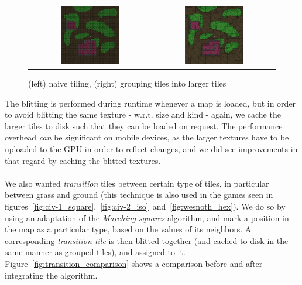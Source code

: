 \begin{figure}[H]
    \centering
    \begin{tabular}{cc}
        \includegraphics[width=0.5\textwidth]{figures/generating_levels/naive-tile.png}
        &
        \includegraphics[width=0.5\textwidth]{figures/generating_levels/grouped-tile.png}
    \end{tabular}
    \caption{(left) naive tiling, (right) grouping tiles into larger tiles}\label{fig:grouped_tiling_comparison}
\end{figure}

The blitting is performed during runtime whenever a map is loaded, but in order
to avoid blitting the same texture - w.r.t. size and kind - again, we cache the
larger tiles to disk such that they can be loaded on request. The performance
overhead \textit{can} be significant on mobile devices, as the larger textures
have to be uploaded to the GPU in order to reflect changes, and we did see
improvements in that regard by caching the blitted textures.
\\
\\
We also wanted \textit{transition} tiles between certain type of tiles, in
particular between grass and ground (this technique is also
used in the games seen in
figures~\ref{fig:civ-1_square},~\ref{fig:civ-2_iso}~and~\ref{fig:wesnoth_hex}).
We do so by using an adaptation of the \textit{Marching squares} algorithm, and
mark a position in the map as a particular type, based on the values of its
neighbors. A corresponding \textit{transition tile} is then blitted together
(and cached to disk in the same manner as grouped tiles), and assigned to it.
Figure~\ref{fig:transition_comparison} shows a comparison before and after
integrating the algorithm.

